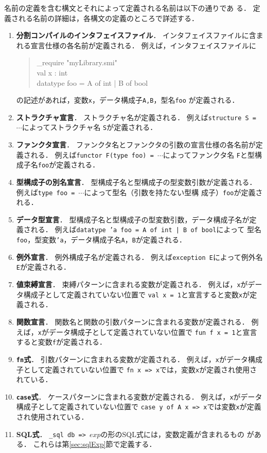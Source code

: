 \documentclass{jbook}
\newcommand{\code}[1]{\mbox{\large\tt #1}}
\newenvironment{program}{\begin{quote}\begin{tt}}%
                        {\end{tt}\end{quote}}
\begin{document}
	名前の定義を含む構文とそれによって定義される名前は以下の通りであ
る．
	定義される名前の詳細は，各構文の定義のところで詳述する．
\begin{enumerate}
\item {\bf 分割コンパイルのインタフェイスファイル}．
	インタフェイスファイルに含まれる宣言仕様の各名前が定義される．
	例えば，インタフェイスファイルに
\begin{program}
\_require "myLibrary.smi"\\
val x : int\\
datatype foo = A of int | B of bool
\end{program}
の記述があれば，変数\code{x}，データ構成子\code{A,B}，型名\code{foo}
が定義される．
\item {\bf ストラクチャ宣言}．
	ストラクチャ名が定義される．
	例えば\code{structure S = $\cdots$}によってストラクチャ名
\code{S}が定義される．
\item {\bf ファンクタ宣言}．
	ファンクタ名とファンクタの引数の宣言仕様の各名前が定義される．
	例えば\code{functor F(type foo) = $\cdots$}によってファンクタ名
\code{F}と型構成子名\code{foo}が定義される．
\item {\bf 型構成子の別名宣言}．
	型構成子名と型構成子の型変数引数が定義される．
	例えば\code{type foo = $\cdots$}によって型名（引数を持たない型構
成子）\code{foo}が定義される．
\item {\bf データ型宣言}．
	型構成子名と型構成子の型変数引数，データ構成子名が定義される．
	例えば\code{datatype 'a foo = A of int | B of bool}によって
型名\code{foo}，型変数\code{'a}，データ構成子名\code{A}，\code{B}が定義される．
\item {\bf 例外宣言}．
	例外構成子名が定義される．
	例えば\code{exception E}によって例外名\code{E}が定義される．
\item {\bf 値束縛宣言}．
	束縛パターンに含まれる変数が定義される．
	例えば，\code{x}がデータ構成子として定義されていない位置で
\code{val x = 1}と宣言すると変数\code{x}が定義される．
\item {\bf 関数宣言}．
	関数名と関数の引数パターンに含まれる変数が定義される．
	例えば，\code{x}がデータ構成子として定義されていない位置で
\code{fun f x = 1}と宣言すると変数\code{f}が定義される．
\item {\bf \code{fn}式}．
	引数パターンに含まれる変数が定義される．
	例えば，\code{x}がデータ構成子として定義されていない位置で
\code{fn x => x}では，変数\code{x}が定義され使用されている．
\item {\bf \code{case}式}．
	ケースパターンに含まれる変数が定義される．
	例えば，\code{x}がデータ構成子として定義されていない位置で
\code{case y of A x => x}では変数\code{x}が定義され使用されている．
\item {\bf SQL式}．
	\code{\_sql db => $exp$}の形のSQL式には，変数定義が含まれるもの
がある．
	これらは第\ref{sec:sqlExp}節で定義する．
\end{enumerate}
\end{document}
